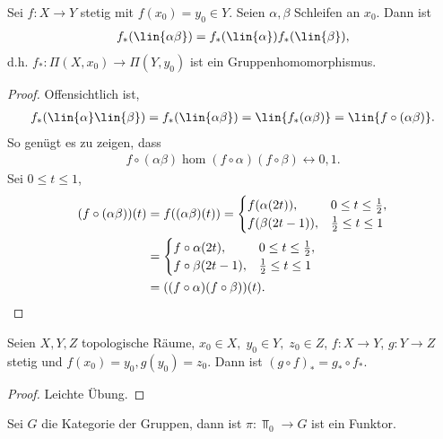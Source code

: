 \begin{lem}
\label{prop:3.2.3}
Sei $f:X\to Y$ stetig mit $f(x_0) = y_0\in Y$. Seien $\alpha,\beta$ Schleifen
an $x_0$. Dann ist
\begin{align*}
f_*(\lin{\alpha\beta}) = f_*(\lin{\alpha})f_*(\lin{\beta}),
\end{align*}
d.h. $f_*: \Pi(X,x_0) \to \Pi(Y,y_0)$ ist ein Gruppenhomomorphismus.\fishhere
\end{lem}
\begin{proof}
Offensichtlich ist,
\begin{align*}
f_*(\lin{\alpha}\lin{\beta}) = f_*(\lin{\alpha\beta}) = \lin{f_*(\alpha\beta)}
= \lin{f\circ(\alpha\beta)}.
\end{align*}
So genügt es zu zeigen, dass
\begin{align*}
f\circ(\alpha\beta) \hom (f\circ\alpha)(f\circ\beta) \rel{0,1}.
\end{align*}
Sei $0\le t\le 1$,
\begin{align*}
(f\circ(\alpha\beta))(t) &= f((\alpha\beta)(t)) = \begin{cases}
                                                 f(\alpha(2t)), & 0\le t\le
                                                 \frac{1}{2},\\
                                                 f(\beta(2t-1)), & \frac{1}{2}\le t\le
                                                 1
                                                 \end{cases}
\\ &= \begin{cases}
  f\circ\alpha(2t), & 0\le t\le \frac{1}{2},\\
  f\circ\beta(2t-1), & \frac{1}{2}\le t\le 1
  \end{cases}
\\ &= ((f\circ\alpha)(f\circ\beta))(t).\qedhere
\end{align*}
\end{proof}
\begin{lem}
\label{prop:3.2.4}
Seien $X,Y,Z$ topologische Räume, $x_0\in X,\;y_0\in Y,\;z_0\in Z$, $f: X\to
Y$, $g: Y\to Z$ stetig und $f(x_0) = y_0, g(y_0) = z_0$. Dann ist $(g\circ f)_*
= g_*\circ f_*$.\fishhere
\end{lem}
\begin{proof}
Leichte Übung.\qedhere
\end{proof}

\begin{cor}
\label{prop:3.2.5} Sei $G$ die Kategorie der Gruppen, dann ist
$\pi: \Top_0\to G$ ist ein Funktor.\fishhere
\end{cor}

